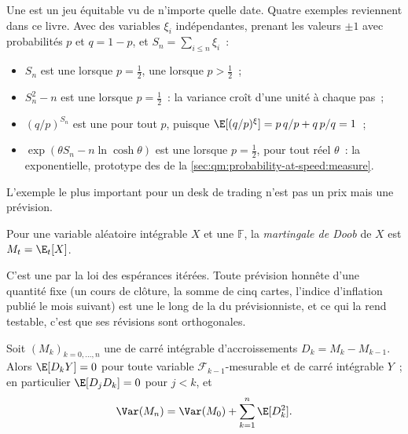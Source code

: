 Une  est un jeu équitable vu de n'importe quelle date. Quatre exemples reviennent dans ce livre. Avec des variables $\xi_i$ indépendantes, prenant les valeurs $\pm 1$ avec
probabilités $p$ et $q = 1 - p$, et $S_n = \sum_{i \le n}\xi_i$~:
\begin{itemize}
\item $S_n$ est une  lorsque $p = \tfrac12$, une  lorsque $p > \tfrac12$~;
\item $S_n^2 - n$ est une  lorsque $p = \tfrac12$~: la variance croît d'une unité à chaque pas~;
\item $(q/p)^{S_n}$ est une  pour tout $p$, puisque $\E[(q/p)^{\xi}] = p\,q/p + q\,p/q = 1$~;
\item $\exp(\theta S_n - n\ln\cosh\theta)$ est une  lorsque $p = \tfrac12$, pour tout réel
$\theta$~: la  exponentielle, prototype des  de
la \cref{sec:qm:probability-at-speed:measure}.
\end{itemize}

L'exemple le plus important pour un desk de trading n'est pas un prix mais une prévision.

\begin{definition}\label{def:qm:probability-at-speed:doob}
Pour une variable aléatoire intégrable $X$ et une  $\mathbb F$, la \emph{martingale
de Doob} de $X$ est $M_t = \E_t[X]$.
\end{definition}

C'est une  par la loi des espérances itérées. Toute prévision honnête d'une quantité fixe (un cours
de clôture, la somme de cinq cartes, l'indice d'inflation publié le mois suivant) est une  le long de la
 du prévisionniste, et ce qui la rend testable, c'est que ses révisions sont orthogonales.

\begin{proposition}\label{prop:qm:probability-at-speed:orthogonal}
Soit $(M_k)_{k = 0,\dots,n}$ une  de carré intégrable d'accroissements $D_k = M_k -
M_{k-1}$. Alors $\E[D_k Y] = 0$ pour toute variable $\mathcal F_{k-1}$-mesurable et de carré
intégrable $Y$~; en particulier $\E[D_jD_k] = 0$ pour $j < k$, et
\[
\Var(M_n) = \Var(M_0) + \sum_{k=1}^n \E[D_k^2].
\]
\end{proposition}

